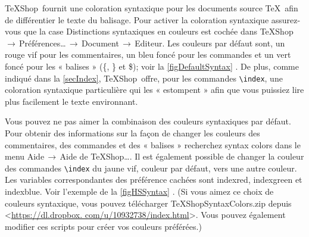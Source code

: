 \documentclass[11pt,french]{article}
\newcommand{\TS}{\textsf{\TeX Shop}}
\newcommand{\cmd}[1]{\textsf{#1}}
\newcommand{\mnu}[1]{\textsf{#1}}
\newcommand{\To}{\,\(\to\)\,}
\begin{document}
%


\TS\ fournit une coloration syntaxique pour les documents source \TeX\ afin de différentier le texte du balisage. Pour activer la coloration syntaxique assurez-vous que la case \mnu{Distinctions syntaxiques en couleurs} est cochée dans \mnu{TeXShop}\To\mnu{Préférences…}\To\mnu{Document}\To\mnu{Editeur}. Les couleurs par défaut sont, un rouge vif pour les commentaires, un bleu foncé pour les commandes et un vert foncé pour les « balises » (\cmd{\{}, \cmd{\}} et \cmd{\$}); voir la \cref{figDefaultSyntax} . De plus, comme indiqué dans la \cref{secIndex}, \TS\ offre, pour les commandes \verb+\index+, une coloration syntaxique particulière qui les « estompent » afin que vous puissiez lire plus facilement le texte environnant.

Vous pouvez ne pas aimer la combinaison des couleurs syntaxiques par défaut. Pour obtenir des informations sur la façon de changer les couleurs des commentaires, des commandes et des « balises » recherchez \cmd{syntax colors} dans le menu \mnu{Aide}\To\mnu{Aide de TeXShop…}. Il est également possible de changer la couleur des commandes \verb+\index+ du jaune vif, couleur par défaut, vers une autre couleur. Les variables correspondantes des préférence cachées sont \cmd{indexred}, \cmd{indexgreen} et \cmd{indexblue}. Voir l'exemple de la \cref{figHSSyntax} . (Si vous aimez ce choix de couleurs syntaxique, vous pouvez télécharger \cmd{TeXShopSyntaxColors.zip} depuis <\url{https://dl.dropbox. com/u/10932738/index.html}>. Vous pouvez également modifier ces scripts pour créer vos couleurs préférées.)
\end{document}
